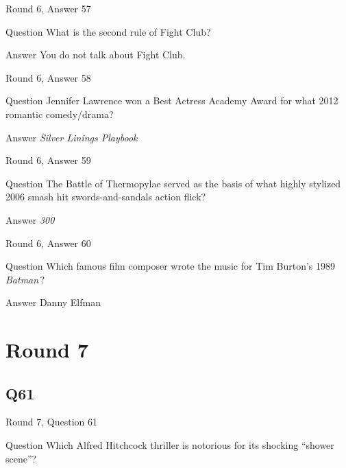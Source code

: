 \documentclass[11pt]{beamer}
\begin{document}
\begin{frame}[t]{Round 6, Answer 57}
\vspace{2em}
\begin{block}{Question}
What is the second rule of Fight Club?
\end{block}
\pause{}
\begin{block}{Answer}
You do not talk about Fight Club.
\end{block}
\end{frame}
    

\begin{frame}[t]{Round 6, Answer 58}
\vspace{2em}
\begin{block}{Question}
Jennifer Lawrence won a Best Actress Academy Award for what 2012 romantic comedy/drama?
\end{block}
\pause{}
\begin{block}{Answer}
\emph{Silver Linings Playbook}
\end{block}
\end{frame}
    

\begin{frame}[t]{Round 6, Answer 59}
\vspace{2em}
\begin{block}{Question}
The Battle of Thermopylae served as the basis of what highly stylized 2006 smash hit swords-and-sandals action flick?
\end{block}
\pause{}
\begin{block}{Answer}
\emph{300}
\end{block}
\end{frame}
    

\begin{frame}[t]{Round 6, Answer 60}
\vspace{2em}
\begin{block}{Question}
Which famous film composer wrote the music for Tim Burton's 1989 \emph{Batman}\,?
\end{block}
\pause{}
\begin{block}{Answer}
Danny Elfman
\end{block}
\end{frame}
    

\section{Round 7}
    

\subsection*{Q61}
\begin{frame}[t]{Round 7, Question 61}
\vspace{2em}
\begin{block}{Question}
Which Alfred Hitchcock thriller is notorious for its shocking ``shower scene''?
\end{block}
\end{frame}
    
\end{document}
